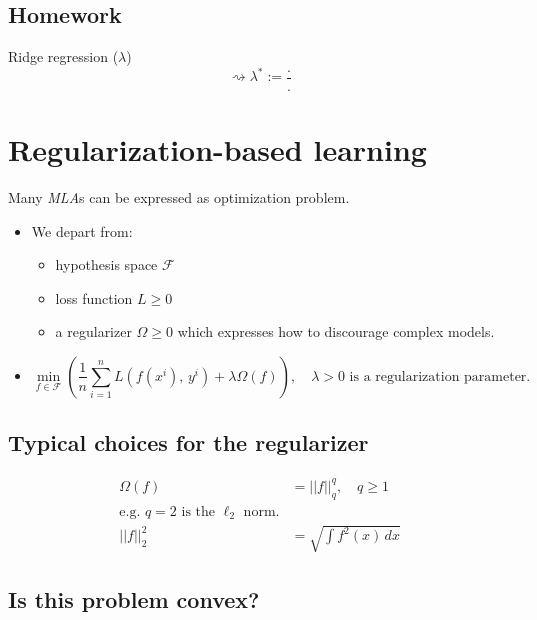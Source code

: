 \subsection{Homework} %
\label{sub:Homework}

Ridge regression ($\lambda$)
\begin{equation}
	\rightsquigarrow \lambda ^* := \frac{.}{.}
\end{equation}

\section{Regularization-based learning} %
\label{sec:Regularization-based-learning}

Many \emph{MLA}s can be expressed as optimization problem.

\begin{itemize}
	\item We depart from:
	      \begin{itemize}
		      \item hypothesis space $\mathcal{F}$
		      \item loss function $L \geq 0$
		      \item a regularizer $\Omega \geq 0$ which expresses how to discourage complex models.
	      \end{itemize}
	\item
\[
	\min_{f \in \mathcal{F}} \left(\frac{1}{n} \sum_{i=1}^n L\left(f(x^i),\, y^i\right) + \lambda\Omega(f) \right)
	, \quad \lambda > 0 \text{ is a regularization parameter.}
\]

\end{itemize}

\subsection{Typical choices for the regularizer} %

\begin{align*}
	\Omega(f) & = ||f||_q^q, \quad q \geq 1                 \\
	\text{e.g. } q = 2 \text{ is the } \ell_2 \text{ norm.} \\
	||f||_2^2 & = \sqrt{\int f^2(x) \, dx}
\end{align*}

\subsection*{Is this problem convex?} %

